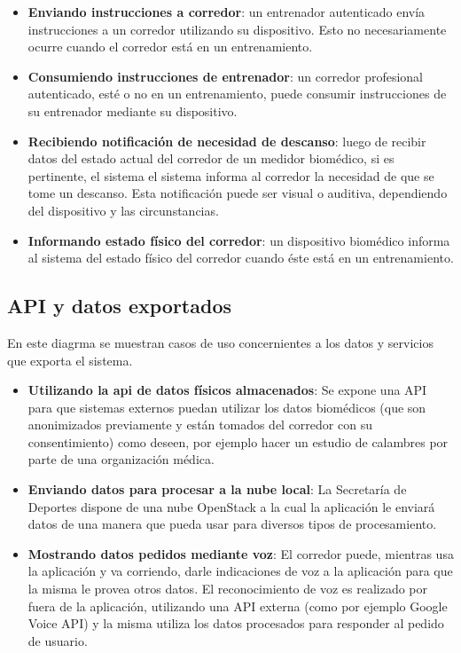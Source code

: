 \begin{itemize}
	\item \textbf{Enviando instrucciones a corredor}: un entrenador autenticado envía instrucciones a un corredor utilizando su dispositivo. Esto no necesariamente ocurre cuando el corredor está en un entrenamiento.
	\item \textbf{Consumiendo instrucciones de entrenador}: un corredor profesional autenticado, esté o no en un entrenamiento, puede consumir instrucciones de su entrenador mediante su dispositivo. 
	\item \textbf{Recibiendo notificación de necesidad de descanso}: luego de recibir datos del estado actual del corredor de un medidor biomédico, si es pertinente, el sistema el sistema informa al corredor la necesidad de que se tome un descanso. Esta notificación puede ser visual o auditiva, dependiendo del dispositivo y las circunstancias.
	\item \textbf{Informando estado físico del corredor}: un dispositivo biomédico informa al sistema del estado físico del corredor cuando éste está en un entrenamiento.
\end{itemize}


\subsection{API y datos exportados}
En este diagrma se muestran casos de uso concernientes a los datos y servicios que exporta el sistema.

\begin{itemize}
	\item \textbf{Utilizando la api de datos físicos almacenados}: Se expone una API para que sistemas externos puedan utilizar los datos biomédicos (que son anonimizados previamente y están tomados del corredor con su consentimiento) como deseen, por ejemplo hacer un estudio de calambres por parte de una organización médica. 
	\item \textbf{Enviando datos para procesar a la nube local}: La Secretaría de Deportes dispone de una nube OpenStack a la cual la aplicación le enviará datos de una manera que pueda usar para diversos tipos de procesamiento. 
	\item \textbf{Mostrando datos pedidos mediante voz}: El corredor puede, mientras usa la aplicación y va corriendo, darle indicaciones de voz a la aplicación para que la misma le provea otros datos. El reconocimiento de voz es realizado por fuera de la aplicación, utilizando una API externa (como por ejemplo Google Voice API) y la misma utiliza los datos procesados para responder al pedido de usuario.
\end{itemize}


